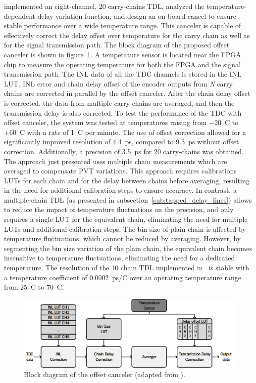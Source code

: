 \citet{pvt_offset} implemented an eight-channel, 20 carry-chains \gls{TDL}, analyzed the temperature-dependent delay variation function, and design an on-board cancel to ensure stable performance over a wide temperature range. This canceler is capable of effectively correct the delay offset over temperature for the carry chain as well as for the signal transmission path. The block diagram of the proposed offset canceler is shown in figure~\ref{fig:offset_canceller}. A temperature sensor is located near the \gls{FPGA} chip to measure the operating temperature for both the \gls{FPGA} and the signal transmission path. The \gls{INL} data of all the \gls{TDC} channels is stored in the \gls{INL} \gls{LUT}. \gls{INL} error and chain delay offset of the encoder outputs from \textit{N} carry chains are corrected in parallel by the offset canceler. After the chain delay offset is corrected, the data from multiple carry chains are averaged, and then the transmission delay is also corrected. To test the performance of the \gls{TDC} with offset canceler, the system was tested at temperatures raising from −20~\textdegree C to +60~\textdegree C with a rate of 1~\textdegree C per minute. The use of offset correction allowed for a significantly improved resolution of 4.4~ps, compared to 9.3~ps without offset correction. Additionally, a precision of 3.5~ps for 20 carry-chains was obtained. The approach just presented uses multiple chain measurements which are averaged to compensate \gls{PVT} variations. This approach requires calibrations \glspl{LUT} for each chain and for the delay between chains before averaging, resulting in the need for additional calibration steps to ensure accuracy. In contrast, a multiple-chain \gls{TDL} (as presented in subsection~\ref{sub:tapped_delay_lines}) allows to reduce the impact of temperature fluctuations on the precision, and only requires a single \gls{LUT} for the equivalent chain, eliminating the need for multiple \glspl{LUT} and additional calibration steps. The bin size of plain chain is affected by temperature fluctuations, which cannot be reduced by averaging. However, by segmenting the bin size variation of the plain chain, the equivalent chain becomes insensitive to temperature fluctuations, eliminating the need for a dedicated temperature. The resolution of the 10 chain \gls{TDL} implemented in~\citep{pvt_mc} is stable with a temperature coefficient of 0.0002~ps/\textdegree C over an operating temperature range from 25~\textdegree C to 70~\textdegree C.

\begin{figure}[ht!]
	\centering
	\includegraphics[width=.8\textwidth]{img/02_StateofArt/offset_canceller.png}
	\caption{Block diagram of the offset canceler (adapted from \citep{pvt_offset}).}
	\label{fig:offset_canceller}
\end{figure}

